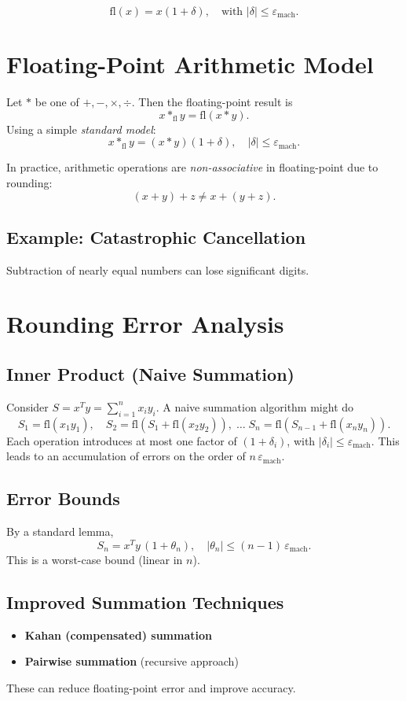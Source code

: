 \documentclass[12pt]{article}
\begin{document}
\[
\mathrm{fl}(x) = x(1 + \delta), \quad \text{with }|\delta| \le \varepsilon_{\text{mach}}.
\]

\section*{Floating-Point Arithmetic Model}

Let $*$ be one of $+,-,\times,\div$. Then the floating-point result is
\[
x *_{\mathrm{fl}} y = \mathrm{fl}(x * y).
\]
Using a simple \emph{standard model}:
\[
x *_{\mathrm{fl}} y = (x * y)(1 + \delta),
\quad |\delta| \le \varepsilon_{\text{mach}}.
\]

In practice, arithmetic operations are \emph{non-associative} in floating-point due to rounding:
\[
(x + y) + z \neq x + (y + z).
\]

\subsection*{Example: Catastrophic Cancellation}
Subtraction of nearly equal numbers can lose significant digits.

\section*{Rounding Error Analysis}

\subsection*{Inner Product (Naive Summation)}
Consider $S = x^T y = \sum_{i=1}^n x_i y_i$. A naive summation algorithm might do
\[
S_1 = \mathrm{fl}(x_1y_1),\quad
S_2 = \mathrm{fl}(S_1 + \mathrm{fl}(x_2y_2)),\;\dots\;
S_n = \mathrm{fl}(S_{n-1} + \mathrm{fl}(x_ny_n)).
\]
Each operation introduces at most one factor of $(1 + \delta_i)$, with $|\delta_i| \le \varepsilon_{\mathrm{mach}}$. This leads to an accumulation of errors on the order of $n\,\varepsilon_{\mathrm{mach}}$.

\subsection*{Error Bounds}
By a standard lemma,
\[
S_n = x^T y\,(1 + \theta_n),
\quad
|\theta_n| \le (n-1)\,\varepsilon_{\mathrm{mach}}.
\]
This is a worst-case bound (linear in $n$).

\subsection*{Improved Summation Techniques}
\begin{itemize}
    \item \textbf{Kahan (compensated) summation} 
    \item \textbf{Pairwise summation} (recursive approach)
\end{itemize}
These can reduce floating-point error and improve accuracy.
\end{document}
